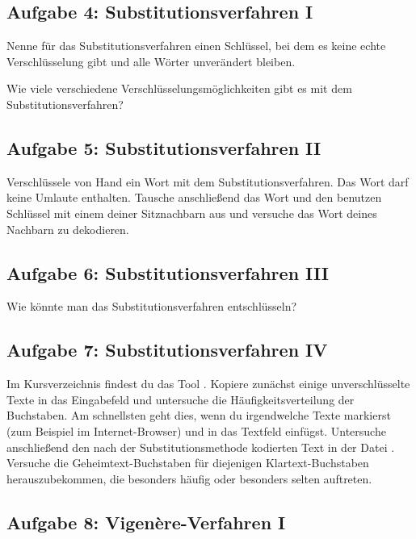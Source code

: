 \subsection{Aufgabe 4: Substitutionsverfahren I}

\begin{compactenum}[a)]
\item Nenne für das Substitutionsverfahren einen Schlüssel, bei dem es keine
echte Verschlüsselung gibt und alle Wörter unverändert bleiben.
\item Wie viele verschiedene Verschlüsselungsmöglichkeiten gibt es mit dem
 Substitutionsverfahren?
\end{compactenum}


\subsection{Aufgabe 5: Substitutionsverfahren II}

Verschlüssele von Hand ein Wort mit dem Substitutionsverfahren. Das Wort darf
keine Umlaute enthalten. Tausche anschließend das Wort und den benutzen
Schlüssel mit einem deiner Sitznachbarn aus und versuche das Wort deines
Nachbarn zu dekodieren.


\subsection{Aufgabe 6: Substitutionsverfahren III}

Wie könnte man das Substitutionsverfahren entschlüsseln?


\subsection{Aufgabe 7: Substitutionsverfahren IV}

Im Kursverzeichnis findest du das Tool . Kopiere
zunächst einige unverschlüsselte Texte in das Eingabefeld und untersuche die
Häufigkeitsverteilung der Buchstaben. Am schnellsten geht dies, wenn du
irgendwelche Texte markierst (zum Beispiel im Internet-Browser) und in das
Textfeld einfügst. Untersuche anschließend den nach der Substitutionsmethode
kodierten Text in der Datei . Versuche die
Geheimtext-Buchstaben für diejenigen Klartext-Buchstaben herauszubekommen, die
besonders häufig oder besonders selten auftreten.


\subsection{Aufgabe 8: Vigenère-Verfahren I}


